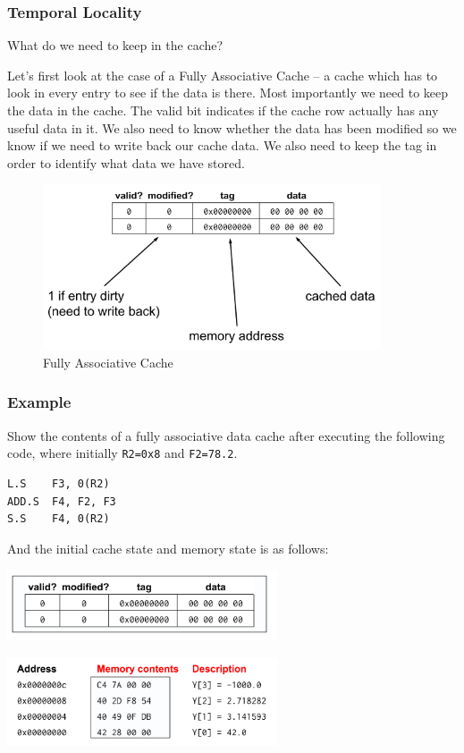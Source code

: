 \documentclass{article}
\begin{document}
\subsubsection{Temporal Locality}

What do we need to keep in the cache? 

Let's first look at the case of a Fully Associative Cache -- a cache which has to look in every entry to see if the data is there. Most importantly we need to keep the data in the cache. The valid bit indicates if the cache row actually has any useful data in it. We also need to know whether the data has been modified so we know if we need to write back our cache data. We also need to keep the tag in order to identify what data we have stored. 

\begin{figure}[ht!]
\centering
\includegraphics[width=100mm]{img/FAC.png}
\caption{Fully Associative Cache}
\end{figure}

\subsubsection*{Example}

Show the contents of a fully associative data cache after executing the following code, where initially \verb|R2=0x8| and \verb|F2=78.2|.

\begin{verbatim}
L.S    F3, 0(R2)
ADD.S  F4, F2, F3
S.S    F4, 0(R2)
\end{verbatim}

And the initial cache state and memory state is as follows:

\includegraphics[width=80mm]{img/Miss.png}


\includegraphics[width=80mm]{img/MemoryState.png}
\end{document}
